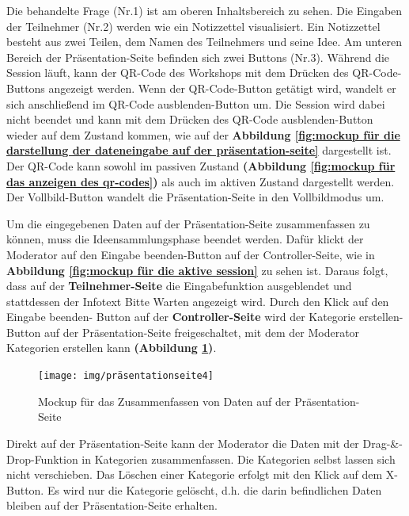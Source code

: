 \begin{itemize}
Die behandelte Frage (Nr.1) ist am oberen Inhaltsbereich zu sehen. Die Eingaben der Teilnehmer (Nr.2) werden wie ein Notizzettel visualisiert. Ein Notizzettel besteht aus zwei Teilen, dem Namen des Teilnehmers und seine Idee. Am unteren Bereich der Präsentation-Seite befinden sich zwei Buttons (Nr.3). Während die Session läuft, kann der QR-Code des Workshops mit dem Drücken des QR-Code-Buttons angezeigt werden. Wenn der QR-Code-Button getätigt wird, wandelt er sich anschließend im \glqq QR-Code ausblenden\grqq{}-Button um. Die Session wird dabei nicht beendet und kann mit dem Drücken des \glqq QR-Code ausblenden\grqq{}-Button wieder auf dem Zustand kommen, wie auf der \textbf{Abbildung \ref{fig:mockup für die darstellung der dateneingabe auf der präsentation-seite}} dargestellt ist. Der QR-Code kann sowohl im passiven Zustand \textbf{(Abbildung \ref{fig:mockup für das anzeigen des qr-codes})} als auch im aktiven Zustand dargestellt werden. Der Vollbild-Button wandelt die Präsentation-Seite in den Vollbildmodus um.\bigskip

Um die eingegebenen Daten auf der Präsentation-Seite zusammenfassen zu können, muss die Ideensammlungsphase beendet werden. Dafür klickt der Moderator auf den \glqq Eingabe beenden\grqq{}-Button auf der Controller-Seite, wie in \textbf{Abbildung \ref{fig:mockup für die aktive session}} zu sehen ist. Daraus folgt, dass auf der \textbf{Teilnehmer-Seite} die Eingabefunktion ausgeblendet und stattdessen der Infotext \glqq Bitte Warten\grqq{} angezeigt wird. Durch den Klick auf den \glqq Eingabe beenden\grqq{}- Button auf der \textbf{Controller-Seite} wird der \glqq Kategorie erstellen\grqq{}-Button auf der Präsentation-Seite freigeschaltet, mit dem der Moderator Kategorien erstellen kann \textbf{(Abbildung \ref{fig:mockup für zusammenfassung-modus auf der präsentation-seite})}.

\begin{figure}[H]
  \begin{center}
    \texttt{[image: img/präsentationseite4]}
	\caption{Mockup für das Zusammenfassen von Daten auf der Präsentation-Seite}  
	\label{fig:mockup für zusammenfassung-modus auf der präsentation-seite}
  \end{center}   
\end{figure}

Direkt auf der Präsentation-Seite kann der Moderator die Daten mit der Drag-\&-Drop-Funktion in Kategorien zusammenfassen. Die Kategorien selbst lassen sich nicht verschieben. Das Löschen einer Kategorie erfolgt mit den Klick auf dem X-Button. Es wird nur die Kategorie gelöscht, d.h. die darin befindlichen Daten bleiben auf der Präsentation-Seite erhalten.
\end{itemize}


